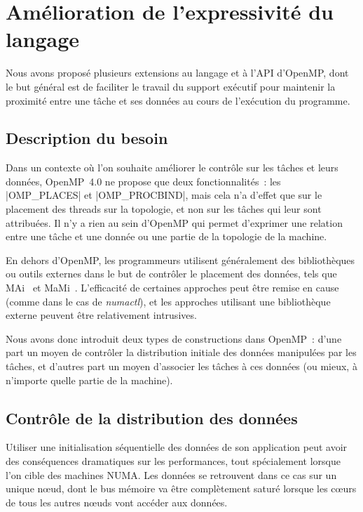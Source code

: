 \section{Amélioration de l'expressivité du langage}\label{sec:openmp:langage}

Nous avons proposé plusieurs extensions au langage et à l'API d'OpenMP, dont le but général est de faciliter le travail du support exécutif pour maintenir la proximité entre une tâche et ses données au cours de l'exécution du programme.

\subsection{Description du besoin}

Dans un contexte où l'on souhaite améliorer le contrôle sur les tâches et leurs données, OpenMP~4.0 ne propose que deux fonctionnalités~: les |OMP_PLACES| et |OMP_PROCBIND|, mais cela n'a d'effet que sur le placement des threads sur la topologie, et non sur les tâches qui leur sont attribuées.
Il n'y a rien au sein d'OpenMP qui permet d'exprimer une relation entre une tâche et une donnée ou une partie de la topologie de la machine.

En dehors d'OpenMP, les programmeurs utilisent généralement des bibliothèques ou outils externes dans le but de contrôler le placement des données, tels que MAi~\cite{Pousa2009} et MaMi~\cite{Broquedis2010a}.
L'efficacité de certaines approches peut être remise en cause (comme dans le cas de \emph{numactl}), et les approches utilisant une bibliothèque externe peuvent être relativement intrusives.

Nous avons donc introduit deux types de constructions dans OpenMP~: d'une part un moyen de contrôler la distribution initiale des données manipulées par les tâches, et d'autres part un moyen d'associer les tâches à ces données (ou mieux, à n'importe quelle partie de la machine).

\subsection{Contrôle de la distribution des données}\label{sec:openmp:langage:init}

Utiliser une initialisation séquentielle des données de son application peut avoir des conséquences dramatiques sur les performances, tout spécialement lorsque l'on cible des machines NUMA.
Les données se retrouvent dans ce cas sur un unique nœud, dont le bus mémoire va être complètement saturé lorsque les cœurs de tous les autres nœuds vont accéder aux données.

